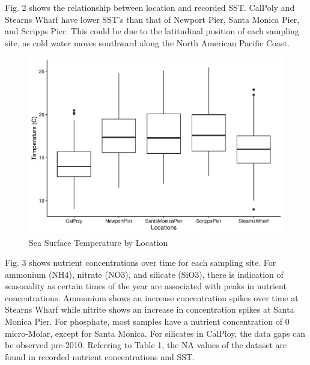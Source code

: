 \documentclass[
  12pt,
]{article}
\begin{document}
\newpage

Fig. 2 shows the relationship between location and recorded SST. CalPoly
and Stearns Wharf have lower SST's than that of Newport Pier, Santa
Monica Pier, and Scripps Pier. This could be due to the latitudinal
position of each sampling site, as cold water moves southward along the
North American Pacific Coast.

\begin{figure}
\centering
\includegraphics{Habs_Final_Report_files/figure-latex/Exploratory Analysis Part 2 SST-1.pdf}
\caption{Sea Surface Temperature by Location}
\end{figure}

\newpage

Fig. 3 shows nutrient concentrations over time for each sampling site.
For ammonium (NH4), nitrate (NO3), and silicate (SiO3), there is
indication of seasonality as certain times of the year are associated
with peaks in nutrient concentrations. Ammonium shows an increase
concentration spikes over time at Stearns Wharf while nitrite shows an
increase in concentration spikes at Santa Monica Pier. For phosphate,
most samples have a nutrient concentration of 0 micro-Molar, except for
Santa Monica. For silicates in CalPloy, the data gaps can be observed
pre-2010. Referring to Table 1, the NA values of the dataset are found
in recorded nutrient concentrations and SST.
\end{document}
